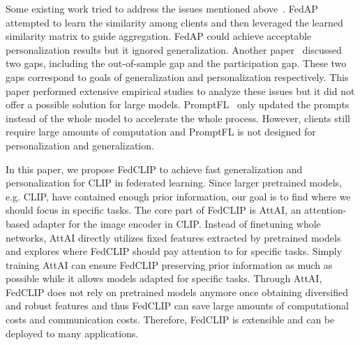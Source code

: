 \documentclass[11pt]{article}
\newcommand{\method}{FedCLIP\xspace}
\newcommand{\mecom}{AttAI\xspace}
\newcommand{\wjdd}[1]{\todo[linecolor=cyan,backgroundcolor=cyan!25,bordercolor=cyan,size=\scriptsize]{(WJD): #1}}
\begin{document}

Some existing work tried to address the issues mentioned above~\cite{Jindong-lu2022personalized, Jindong-Honglinyuan2022, Jindong-guo2022promptfl}.
FedAP~\cite{Jindong-lu2022personalized} attempted to learn the similarity among clients and then leveraged the learned similarity matrix to guide aggregation.
FedAP could achieve acceptable personalization results but it ignored generalization.
Another paper~\cite{Jindong-Honglinyuan2022} discussed two gaps, including the out-of-sample gap and the participation gap.
These two gaps correspond to goals of generalization and personalization respectively.
This paper performed extensive empirical studies to analyze these issues but it did not offer a possible solution for large models.
PromptFL~\cite{Jindong-guo2022promptfl} only updated the prompts instead of the whole model to accelerate the whole process.
However, clients still require large amounts of computation and PromptFL is not designed for personalization and generalization.

In this paper, we propose \method to achieve fast generalization and personalization for CLIP in federated learning.
Since larger pretrained models, e.g. CLIP, have contained enough prior information, our goal is to find where we should focus in specific tasks.
The core part of \method is \mecom, an attention-based adapter for the image encoder in CLIP.
Instead of finetuning whole networks, \mecom directly utilizes fixed features extracted by pretrained models and explores where \method should pay attention to for specific tasks.
Simply training \mecom can ensure \method preserving prior information as much as possible while it allows models adapted for specific tasks.
Through \mecom, \method does not rely on pretrained models anymore once obtaining diversified and robust features and thus \method can save large amounts of computational costs and communication costs.
Therefore, \method is extensible and can be deployed to many applications.

\end{document}
